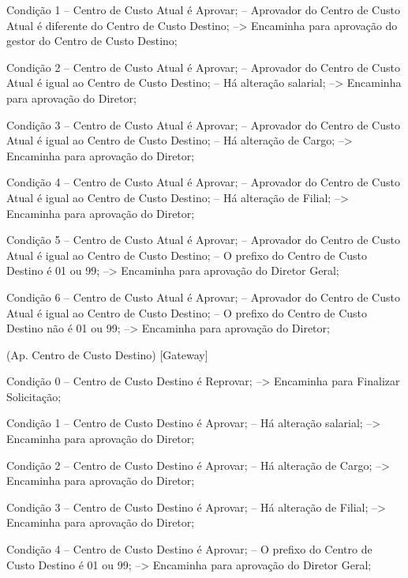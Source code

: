                Condição 1
                  -- Centro de Custo Atual é Aprovar;
                  -- Aprovador do Centro de Custo Atual é diferente do Centro de Custo Destino;
                     --> Encaminha para aprovação do gestor do Centro de Custo Destino;

               Condição 2
                  -- Centro de Custo Atual é Aprovar;
                  -- Aprovador do Centro de Custo Atual é igual ao Centro de Custo Destino;
                  -- Há alteração salarial;
                     --> Encaminha para aprovação do Diretor;

               Condição 3
                  -- Centro de Custo Atual é Aprovar;
                  -- Aprovador do Centro de Custo Atual é igual ao Centro de Custo Destino;
                  -- Há alteração de Cargo;
                     --> Encaminha para aprovação do Diretor;

               Condição 4
                  -- Centro de Custo Atual é Aprovar;
                  -- Aprovador do Centro de Custo Atual é igual ao Centro de Custo Destino;
                  -- Há alteração de Filial;
                     --> Encaminha para aprovação do Diretor;

               Condição 5
                  -- Centro de Custo Atual é Aprovar;
                  -- Aprovador do Centro de Custo Atual é igual ao Centro de Custo Destino;
                  -- O prefixo do Centro de Custo Destino é 01 ou 99;
                     --> Encaminha para aprovação do Diretor Geral;

               Condição 6
                  -- Centro de Custo Atual é Aprovar;
                  -- Aprovador do Centro de Custo Atual é igual ao Centro de Custo Destino;
                  -- O prefixo do Centro de Custo Destino não é 01 ou 99;
                     --> Encaminha para aprovação do Diretor;

               (Ap. Centro de Custo Destino)
                  [Gateway]

                     Condição 0
                        -- Centro de Custo Destino é Reprovar;
                           --> Encaminha para Finalizar Solicitação;

                     Condição 1
                        -- Centro de Custo Destino é Aprovar;
                        -- Há alteração salarial;
                           --> Encaminha para aprovação do Diretor;

                     Condição 2
                        -- Centro de Custo Destino é Aprovar;
                        -- Há alteração de Cargo;
                           --> Encaminha para aprovação do Diretor;

                     Condição 3
                        -- Centro de Custo Destino é Aprovar;
                        -- Há alteração de Filial;
                           --> Encaminha para aprovação do Diretor;

                     Condição 4
                        -- Centro de Custo Destino é Aprovar;
                        -- O prefixo do Centro de Custo Destino é 01 ou 99;
                           --> Encaminha para aprovação do Diretor Geral;
